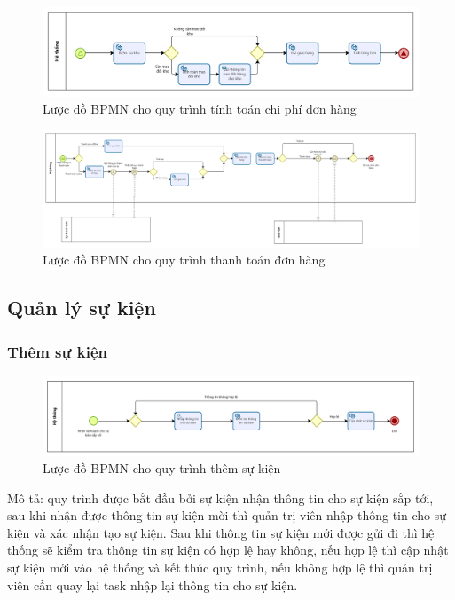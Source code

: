     \begin{figure}[!htp]
        \centering
        \includegraphics[width=5in]{img/BPMN/customer_buy/customer_calc_fee.png}
        \newline
        \caption{Lược đồ BPMN cho quy trình tính toán chi phí đơn hàng}
    \end{figure}
    \begin{figure}[!htp]
        \centering
        \includegraphics[width=15cm]{img/BPMN/customer_buy/customer_payment.png}
        \newline
        \caption{Lược đồ BPMN cho quy trình thanh toán đơn hàng}
    \end{figure}

\newpage
\subsection{Quản lý sự kiện}

\subsubsection{Thêm sự kiện}

\begin{figure}[!htp]
    \centering
    \includegraphics[width=14cm]{img/BPMN/event/add_event.png}
    \newline
    \caption{Lược đồ BPMN cho quy trình thêm sự kiện}
\end{figure}
Mô tả: quy trình được bắt đầu bởi sự kiện nhận thông tin cho sự kiện sắp tới, sau khi nhận được thông tin sự kiện mời thì quản trị viên nhập thông tin cho sự kiện và xác nhận tạo sự kiện. Sau khi thông tin sự kiện mới được gửi đi thì hệ thống sẽ kiểm tra thông tin sự kiện có hợp lệ hay không, nếu hợp lệ thì cập nhật sự kiện mới vào hệ thống và kết thúc quy trình, nếu không hợp lệ thì quản trị viên cần quay lại task nhập lại thông tin cho sự kiện.

